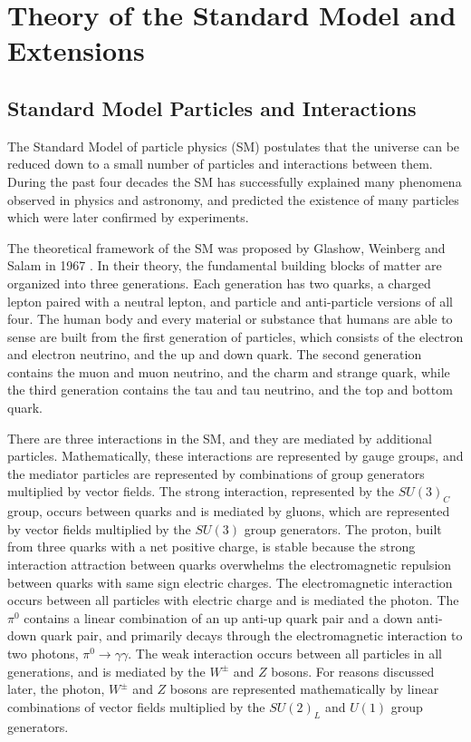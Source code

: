 \chapter{Theory of the Standard Model and Extensions}
\label{wrBosonAndHeavyNu}
\section{Standard Model Particles and Interactions}
The Standard Model of particle physics (SM) postulates that the universe can be reduced down to a small 
number of particles and interactions between them.  During the past four decades the SM has successfully 
explained many phenomena observed in physics and astronomy, and predicted the existence of many particles 
which were later confirmed by experiments.

The theoretical framework of the SM was proposed by Glashow, Weinberg and Salam in 1967 \cite{weinbergSM,salamSM}.  
In their theory, the fundamental building blocks of matter are organized into three generations.  Each 
generation has two quarks, a charged lepton paired with a neutral lepton, and particle and anti-particle 
versions of all four.  The human body and every material or substance that humans are able to sense are 
built from the first generation of particles, which consists of the electron and electron neutrino, and 
the up and down quark.  The second generation contains the muon and muon neutrino, and the charm and 
strange quark, while the third generation contains the tau and tau neutrino, and the top and bottom 
quark.

There are three interactions in the SM, and they are mediated by additional particles.  Mathematically, 
these interactions are represented by gauge groups, and the mediator particles are represented by 
combinations of group generators multiplied by vector fields.  The strong interaction, represented by 
the $SU(3)_{C}$ group, occurs between quarks and is mediated 
by gluons, which are represented by vector fields multiplied by the $SU(3)$ group generators.  The proton, 
built from three quarks with a net positive charge, is stable because the strong interaction attraction 
between quarks overwhelms the electromagnetic repulsion between quarks with same sign electric charges.  
The electromagnetic interaction occurs between all particles with electric charge 
and is mediated the photon.  The $\pi^{0}$ contains a linear combination of an up anti-up quark pair and 
a down anti-down quark pair, and primarily decays through the electromagnetic interaction to two photons, 
$\pi^{0} \rightarrow \gamma\gamma$.  The weak interaction occurs 
between all particles in all generations, and is mediated by the $W^{\pm}$ and $Z$ bosons.  For reasons 
discussed later, the photon, $W^{\pm}$ and $Z$ bosons are represented mathematically by linear combinations 
of vector fields multiplied by the $SU(2)_{L}$ and $U(1)$ group generators.

